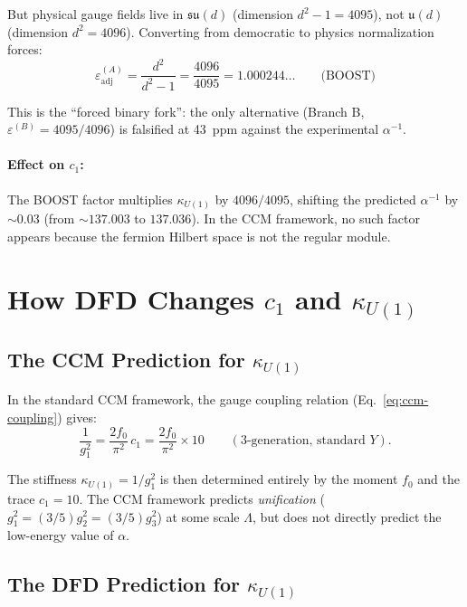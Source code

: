 \documentclass[12pt,a4paper]{article}
\begin{document}
But physical gauge fields live in $\mathfrak{su}(d)$ (dimension $d^2 - 1 = 4095$),
not $\mathfrak{u}(d)$ (dimension $d^2 = 4096$).  Converting from democratic
to physics normalization forces:
\begin{equation}
\boxed{\varepsilon_{\mathrm{adj}}^{(A)} = \frac{d^2}{d^2-1} = \frac{4096}{4095}
= 1.000244\ldots \qquad\text{(BOOST)}}
\end{equation}

This is the ``forced binary fork'': the only alternative (Branch B,
$\varepsilon^{(B)} = 4095/4096$) is falsified at 43~ppm against the
experimental $\alpha^{-1}$.

\paragraph{Effect on $c_1$:}
The BOOST factor multiplies $\kappa_{U(1)}$ by $4096/4095$, shifting the
predicted $\alpha^{-1}$ by $\sim 0.03$ (from $\sim 137.003$ to $137.036$).
In the CCM framework, no such factor appears because the fermion Hilbert
space is not the regular module.

\section{How DFD Changes $c_1$ and $\kappa_{U(1)}$}
\label{sec:c1-change}

\subsection{The CCM Prediction for $\kappa_{U(1)}$}

In the standard CCM framework, the gauge coupling relation
(Eq.~\ref{eq:ccm-coupling}) gives:
\begin{equation}
\frac{1}{g_1^2} = \frac{2f_0}{\pi^2}\,c_1 = \frac{2f_0}{\pi^2} \times 10
\qquad (\text{3-generation, standard } Y).
\end{equation}

The stiffness $\kappa_{U(1)} = 1/g_1^2$ is then determined entirely by the
moment $f_0$ and the trace $c_1 = 10$.  The CCM framework predicts
\emph{unification} ($g_1^2 = (3/5)g_2^2 = (3/5)g_3^2$) at some scale
$\Lambda$, but does not directly predict the low-energy value of $\alpha$.

\subsection{The DFD Prediction for $\kappa_{U(1)}$}
\end{document}
